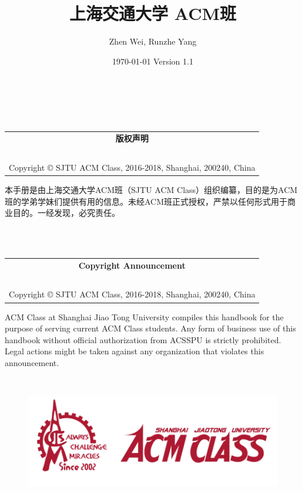 \documentclass{vivid_layout}
\title{上海交通大学 ACM班}{\fontsize{37.5pt}{15pt}\selectfont 学长去哪儿}
\date{\color{white} \today{} \textbullet{} Version 1.1}
\author{Zhen Wei, Runzhe Yang}{}
\begin{document}
\maketitle		%


~\\
~\\
\begin{table}[h]
	\centering
	\begin{tabular}{c}
		{\bf \huge 版权声明}\\
		~\\
		Copyright © SJTU ACM Class, 2016-2018, Shanghai, 200240, China
	\end{tabular}
\end{table}
本手册是由上海交通大学ACM班（SJTU ACM Class）组织编纂，目的是为ACM班的学弟学妹们提供有用的信息。未经ACM班正式授权，严禁以任何形式用于商业目的。一经发现，必究责任。


~\\
~\\
\begin{table}[h]
	\centering
	\begin{tabular}{c}
		{\bf \huge Copyright Announcement}\\
		~\\
		Copyright © SJTU ACM Class, 2016-2018, Shanghai, 200240, China
	\end{tabular}
\end{table}
ACM Class at Shanghai Jiao Tong University compiles this handbook for the purpose of serving current ACM Class students. Any form of business use of this handbook without official authorization from ACSSPU is strictly prohibited. Legal actions might be taken against any organization that violates this announcement.

~\\
\begin{figure}[h]
	\centering
	\includegraphics[width=\textwidth]{img/logo}
\end{figure}

\newpage
\end{document}
